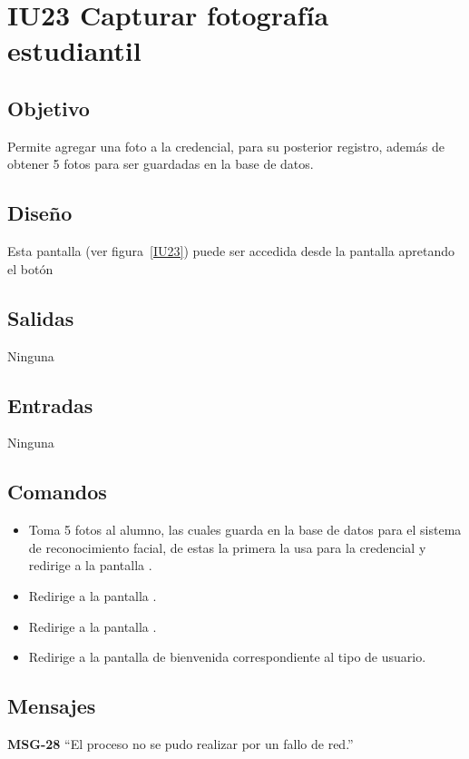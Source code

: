 
\section{IU23 Capturar fotografía estudiantil}

\subsection{Objetivo}
   Permite agregar una foto a la credencial, para su posterior registro, además de obtener 5 fotos para ser guardadas en la base de datos.
\subsection{Diseño}
    Esta pantalla  (ver figura~\ref{IU23}) puede ser accedida desde la pantalla  apretando el botón 


\subsection{Salidas}
Ninguna
\subsection{Entradas}
Ninguna
\subsection{Comandos}
\begin{itemize}
    \item {} Toma 5 fotos al alumno, las cuales guarda en la base de datos para el sistema de reconocimiento facial, de estas la primera la usa para la credencial y redirige a la pantalla .
    \item {} Redirige a la pantalla .
    \item {} Redirige a la pantalla .
    \item {} Redirige a la pantalla de bienvenida correspondiente al tipo de usuario.
    
\end{itemize}

\subsection{Mensajes}

\begin{Citemize}
    \item {\bf MSG-28}  ``El proceso no se pudo realizar por un fallo de red.''
\end{Citemize}

